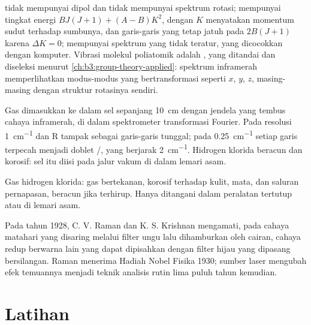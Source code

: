  tidak mempunyai dipol dan tidak mempunyai spektrum rotasi;  mempunyai tingkat energi $BJ(J+1) + (A - B)K^2$, dengan $K$ menyatakan
momentum sudut terhadap sumbunya, dan garis-garis yang tetap jatuh pada
$2B(J+1)$ karena $\Delta K = 0$;  mempunyai spektrum yang tidak
teratur, yang dicocokkan dengan komputer. Vibrasi molekul poliatomik adalah
, yang ditandai dan diseleksi menurut
\cref{ch:b3:group-theory-applied}: spektrum inframerah memperlihatkan
modus-modus yang bertransformasi seperti $x$, $y$, $z$, masing-masing dengan
struktur rotasinya sendiri.

\begin{inthelab}
Gas  dimasukkan ke dalam sel sepanjang \qty{10}{cm} dengan jendela
yang tembus cahaya inframerah, di dalam spektrometer transformasi Fourier.
Pada resolusi \qty{1}{cm^{-1}}  dan R tampak sebagai garis-garis
tunggal; pada \qty{0.25}{cm^{-1}} setiap garis terpecah menjadi doblet
/, yang berjarak \qty{2}{cm^{-1}}. Hidrogen klorida
beracun dan korosif: sel itu diisi pada jalur vakum di dalam lemari asam.
\end{inthelab}

\begin{safety}{}
Gas hidrogen klorida: gas bertekanan, korosif terhadap kulit, mata, dan
saluran pernapasan, beracun jika terhirup. Hanya ditangani dalam peralatan
tertutup atau di lemari asam.
\end{safety}

\begin{history}[Raman, 1928]
Pada tahun 1928, C. V. Raman dan K. S. Krishnan mengamati, pada cahaya
matahari yang disaring melalui filter ungu lalu dihamburkan oleh cairan,
cahaya redup berwarna lain yang dapat dipisahkan dengan filter hijau yang
dipasang bersilangan. Raman menerima Hadiah Nobel Fisika 1930; sumber laser
mengubah efek temuannya menjadi teknik analisis rutin lima puluh tahun
kemudian.
\end{history}

\section{Latihan}


